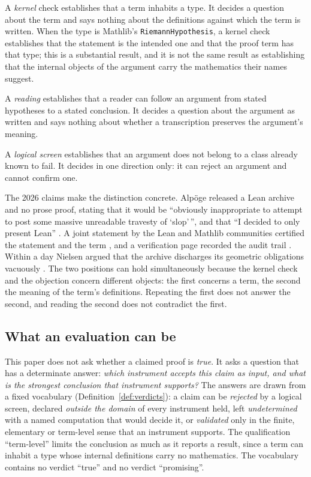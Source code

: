 \documentclass[11pt,a4paper]{article}
\begin{document}
A \emph{kernel} check establishes that a term inhabits a type. It decides a question
about the term and says nothing about the definitions against which the term is written. When
the type is Mathlib's \texttt{RiemannHypothesis}, a kernel check establishes that the statement
is the intended one and that the proof term has that type; this is a substantial result, and it
is not the same result as establishing that the internal objects of the argument carry the
mathematics their names suggest.

A \emph{reading} establishes that a reader can follow an argument from stated
hypotheses to a stated conclusion. It decides a question about the argument as written and says
nothing about whether a transcription preserves the argument's meaning.

A \emph{logical screen} establishes that an argument does not belong to a class already
known to fail. It decides in one direction only: it can reject an argument and cannot confirm
one.

The 2026 claims make the distinction concrete. Alp\"oge released a Lean archive and no
prose proof, stating that it would be ``obviously inappropriate to attempt to post some massive
unreadable travesty of `slop'\,'', and that ``I decided to only present Lean'' \cite{alpoge}. A
joint statement by the Lean and Mathlib communities certified the statement and the term
\cite{leanmathlib}, and a verification page recorded the audit trail \cite{sutherland}. Within a
day Nielsen argued that the archive discharges its geometric obligations vacuously \cite{nielsen}.
The two positions can hold simultaneously because the kernel check and the objection concern
different objects: the first concerns a term, the second the meaning of the term's definitions.
Repeating the first does not answer the second, and reading the second does not contradict the
first.

\subsection{What an evaluation can be}

This paper does not ask whether a claimed proof is \emph{true}. It asks a question that
has a determinate answer: \emph{which instrument accepts this claim as input, and what is the
strongest conclusion that instrument supports?} The answers are drawn from a fixed vocabulary
(Definition~\ref{def:verdicts}): a claim can be \emph{rejected} by a logical screen, declared
\emph{outside the domain} of every instrument held, left \emph{undetermined} with a named
computation that would decide it, or \emph{validated} only in the finite, elementary or
term-level sense that an instrument supports. The qualification ``term-level'' limits the
conclusion as much as it reports a result, since a term can inhabit a type whose internal
definitions carry no mathematics. The vocabulary contains no verdict ``true'' and no verdict
``promising''.
\end{document}
